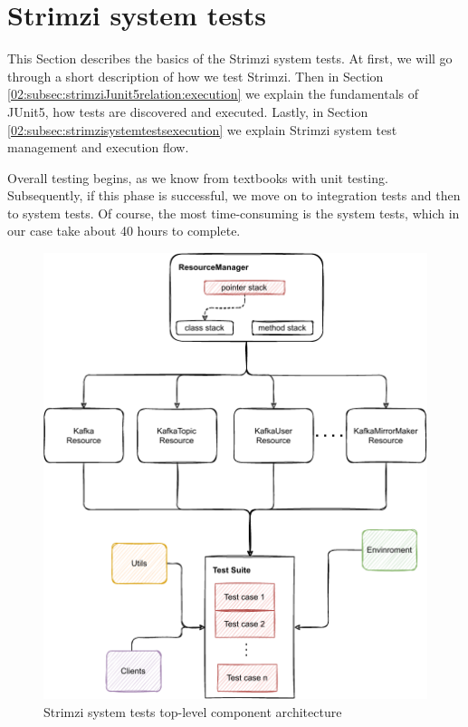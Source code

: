 \section{Strimzi system tests}
\label{02:sec:strimzisystemtests}

This Section describes the basics of the Strimzi system tests.
At first, we will go through a short description of how we test Strimzi.
Then in Section \ref{02:subsec:strimziJunit5relation:execution} we explain the fundamentals of JUnit5, how tests are discovered and executed.
Lastly, in Section \ref{02:subsec:strimzisystemtestsexecution} we explain Strimzi system test management and execution flow.

Overall testing begins, as we know from textbooks with unit testing.
Subsequently, if this phase is successful, we move on to integration tests and then to system tests.
Of course, the most time-consuming is the system tests, which in our case take about 40 hours to complete.
\begin{figure}[!ht]
    \centering
    \includegraphics[scale=0.80]{obrazky-figures/02-preliminaries/04-strimzi-system-tests/01-architecture-overall.pdf}
    \caption{Strimzi system tests top-level component architecture}
    \label{02d:fig:strimzisystemtestarch}
\end{figure}
